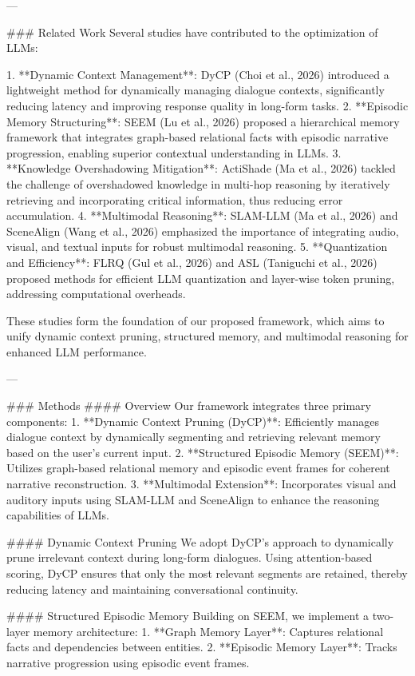 ---

### Related Work
Several studies have contributed to the optimization of LLMs:

1. **Dynamic Context Management**: DyCP (Choi et al., 2026) introduced a lightweight method for dynamically managing dialogue contexts, significantly reducing latency and improving response quality in long-form tasks.
2. **Episodic Memory Structuring**: SEEM (Lu et al., 2026) proposed a hierarchical memory framework that integrates graph-based relational facts with episodic narrative progression, enabling superior contextual understanding in LLMs.
3. **Knowledge Overshadowing Mitigation**: ActiShade (Ma et al., 2026) tackled the challenge of overshadowed knowledge in multi-hop reasoning by iteratively retrieving and incorporating critical information, thus reducing error accumulation.
4. **Multimodal Reasoning**: SLAM-LLM (Ma et al., 2026) and SceneAlign (Wang et al., 2026) emphasized the importance of integrating audio, visual, and textual inputs for robust multimodal reasoning.
5. **Quantization and Efficiency**: FLRQ (Gul et al., 2026) and ASL (Taniguchi et al., 2026) proposed methods for efficient LLM quantization and layer-wise token pruning, addressing computational overheads.

These studies form the foundation of our proposed framework, which aims to unify dynamic context pruning, structured memory, and multimodal reasoning for enhanced LLM performance.

---

### Methods
#### Overview
Our framework integrates three primary components:
1. **Dynamic Context Pruning (DyCP)**: Efficiently manages dialogue context by dynamically segmenting and retrieving relevant memory based on the user's current input.
2. **Structured Episodic Memory (SEEM)**: Utilizes graph-based relational memory and episodic event frames for coherent narrative reconstruction.
3. **Multimodal Extension**: Incorporates visual and auditory inputs using SLAM-LLM and SceneAlign to enhance the reasoning capabilities of LLMs.

#### Dynamic Context Pruning
We adopt DyCP's approach to dynamically prune irrelevant context during long-form dialogues. Using attention-based scoring, DyCP ensures that only the most relevant segments are retained, thereby reducing latency and maintaining conversational continuity.

#### Structured Episodic Memory
Building on SEEM, we implement a two-layer memory architecture:
1. **Graph Memory Layer**: Captures relational facts and dependencies between entities.
2. **Episodic Memory Layer**: Tracks narrative progression using episodic event frames.

